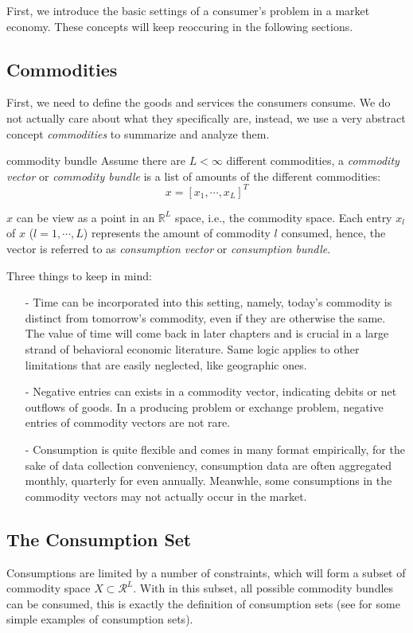 First, we introduce the basic settings of a consumer's problem in a market economy. These concepts will keep reoccuring in the following sections.

\subsection{Commodities}
First, we need to define the goods and services the consumers consume. We do not actually care about what they specifically are, instead, we use a very abstract concept \textit{commodities}
to summarize and analyze them.
\begin{definition}{commodity bundle}{}
    Assume there are $L<\infty$ different commodities, a \textit{commodity vector} or \textit{commodity bundle} is a list of amounts of the different commodities:$$x=\left[x_1,\cdots,x_L\right]^T$$
\end{definition}
$x$ can be view as a point in an $\mathbb{R}^L$ space, i.e., the commodity space. Each entry $x_l$ of $x$ ($l=1,\cdots,L$) represents the amount of commodity $l$ consumed, hence, the vector is referred to
as \textit{consumption vector} or \textit{consumption bundle}.

Three things to keep in mind:
\begin{enumerate}
    \item[-] Time can be incorporated into this setting, namely, today's commodity is distinct from tomorrow's commodity, even if they are otherwise the same. The value of time will come back in later chapters and is crucial in a large strand of behavioral economic literature. Same logic applies to other limitations that are easily neglected, like geographic ones.
    \item[-] Negative entries can exists in a commodity vector, indicating debits or net outflows of goods. In a producing problem or exchange problem, negative entries of commodity vectors are not rare.
    \item[-] Consumption is quite flexible and comes in many format empirically, for the sake of data collection conveniency, consumption data are often aggregated monthly, quarterly for even annually. Meanwhle, some consumptions in the commodity vectors may not actually occur in the market.
\end{enumerate}

\subsection{The Consumption Set}
Consumptions are limited by a number of constraints, which will form a subset of commodity space $X\subset \mathcal{R}^L$. With in this subset, all possible commodity bundles can be 
consumed, this is exactly the definition of consumption sets (see \citet[Page 19-20]{mas1995microeconomic} for some simple examples of consumption sets).

